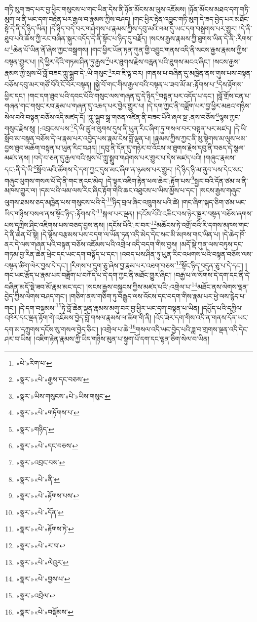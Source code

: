 གཏི་མུག་ཟད་པར་བྱ་ཕྱིར་གསུངས་པ་གང་ཡིན་དེས་ནི་ཉོན་མོངས་མ་ལུས་འཇོམས། །ཉོན་མོངས་མཐའ་དག་གཏི་མུག་ལ་ནི་ཡང་དག་བརྟེན་པར་རྒྱལ་བ་རྣམས་ཀྱིས་བཤད། །གང་ཕྱིར་རྟེན་འབྱུང་གཏི་མུག་དེ་ཟད་བྱེད་པར་མཐོང་སྟེ་དེ་ནི་དེ་ཉིད་ཡིན། །དེ་ཉིད་བདེ་བར་གཤེགས་པ་རྣམས་ཀྱིས་དབུ་མའི་ལམ་དུ་ཡང་དག་བསྒྲགས་པར་གྱུར། །དེ་ནི་ཐུབ་པའི་ཆོས་ཀྱི་རང་བཞིན་སྐུར་འདོད་དེ་ནི་སྟོང་པ་ཉིད་དུ་བརྗོད། །སངས་རྒྱས་རྣམས་ཀྱི་ཐུགས་ཡིན་དེ་ནི་:རིགས་པ་\footnote{«པེ་»རིག་པ་}ཆེན་པོ་ཡིན་ནོ་ཞེས་ཀྱང་བསྒྲགས། །གང་ཕྱིར་ཡོན་ཏན་ཀུན་གྱི་འབྱུང་གནས་འདི་ནི་སངས་རྒྱས་རྣམས་ཀྱིས་བསྟན་གྱུར་པ། །དེ་ཕྱིར་དེའི་གཏམ་ཤིན་ཏུ་རྒྱས་\footnote{«སྣར་»«པེ་»རྒྱས་དང་བཅས་}པར་ཐུགས་རྗེས་བརླན་པའི་ཐུགས་མངའ་ཞིང་། །སངས་རྒྱས་རྣམས་ཀྱི་སྲས་པོ་བློ་བཟང་ཀླུ་སྒྲུབ་དེ་:ཡི་གསུང་\footnote{«སྣར་»ཡིས་གསུངས་«པེ་»ཡིས་གསུང་}རབ་ཇི་ལྟ་བར། །གནས་པ་བཞིན་དུ་མཁྱེན་ནས་གུས་པས་བསྟན་བཅོས་དབུ་མར་གཙོ་བོའི་ངོ་བོར་བསྟན། །སྐྱེ་བོ་གང་གིས་རྒྱལ་བའི་བསྟན་པ་ཟབ་མོ་མ་:རྟོགས་པ་\footnote{«སྣར་»«པེ་»གཏོགས་པ་}དེས་རྟོགས་ཕྱིར་དང་། །གང་དག་ཐུབ་པའི་དབང་པོའི་གསུང་ལས་གཞན་དུ་དེ་ཉིད་\footnote{«སྣར་»གཉིད་}བསྟན་པར་འདོད་པ་དང་། །བློ་གྲོས་ངན་པ་གཞན་གང་གསུང་རབ་རྣམ་པ་གཞན་དུ་འཆད་པར་བྱེད་གྱུར་པ། །དེ་དག་ཀྱང་ནི་བཟློག་པར་བྱ་ཕྱིར་མཐའ་གཉིས་སེལ་བའི་བསྟན་བཅོས་འདི་མཛད་དོ། །ཀླུ་སྒྲུབ་སྒྲ་གཅན་འཛིན་ནི་བཟང་པོའི་ཞལ་སྔ་:ནས་བཅོས་\footnote{«སྣར་»«པེ་»དང་བཅས་}ལྷས་ཀྱང་གསུང་རྗེས་སུ། །:འབྲངས་པས་\footnote{«སྣར་»འབྲང་བས་}དེ་ཡི་ཚུལ་ལུགས་དུས་ནི་ཡུན་རིང་ཞིག་ཏུ་གསལ་བར་བསྟན་པར་མཛད། །དེ་ཡི་སློབ་མ་བསྟན་བཅོས་དེ་ལ་རྣམ་པར་འབྱེད་པས་རྣམ་ངེས་བློ་ལྡན་པ། །རྣམས་ཀྱིས་ཀྱང་ནི་མུ་སྟེགས་མ་ལུས་ཕམ་བྱས་ཐུབ་མཆོག་བསྟན་པ་ཡུན་རིང་བཤད། །དབུ་ནི་དོན་དུ་གཉེར་བ་འོངས་ལ་ཐུགས་རྗེས་དབུ་ནི་བཅད་དེ་སྩལ་མཛད་ནས། །བདེ་བ་ཅན་དུ་རྒྱལ་བའི་སྲས་པོ་ཀླུ་སྒྲུབ་གཤེགས་པར་གྱུར་པ་དེས་མཛད་པའི། །གཞུང་རྣམས་དང་:ནི་དེ་ཡི་\footnote{«སྣར་»«པེ་»ནི་}སློབ་མའི་ཚོགས་དེ་དག་ཀྱང་དུས་མང་ཞིག་ན་ཉམས་པར་གྱུར། །དེ་ཉིད་ཉི་མ་ནུབ་པས་དེང་སང་གཞུང་ལུགས་གསལ་པོ་དེ་ནི་གང་ནའང་མེད། །དེ་ལྟར་འཇིག་རྟེན་ཕལ་ཆེར་:རྟོག་པས་\footnote{«སྣར་»«པེ་»རྟོགས་པས་}སྦྱར་བའི་དོན་ཙམ་ལ་ནི་མཁས་གྱུར་ལ། །དམ་པའི་ལམ་ལས་རིང་ཞིང་རྟོག་གེའི་ཆང་འཐུངས་པ་ཡིས་མྱོས་པ་དང་། །སངས་རྒྱས་གཞུང་ལུགས་ཐམས་ཅད་མཁྱེན་པས་གསུངས་པའི་དེ་\footnote{«སྣར་»«པེ་»དོན་}ཉིད་བྲལ་ཞིང་འཁྲུགས་པའི་ཚེ། །གང་ཞིག་སྐད་ཅིག་ཙམ་ཡང་ཡིད་གཉིས་བསལ་ནས་སྟོང་ཉིད་:རྟོགས་དེ་\footnote{«སྣར་»«པེ་»རྟོགས་ཏེ་}སྐལ་པར་ལྡན། །དངོས་པོའི་འཆིང་བས་ཉེར་སྦྱར་བསྟན་བཅོས་ཞགས་པས་དཀྲིས་ཤིང་འཇིགས་པས་བཅད་བྱས་ནས། །དངོས་པོའི་:ར་བར་\footnote{«སྣར་»«པེ་»ར་བ་}མཆོངས་ཏེ་འགྲོ་བའི་རི་དགས་མཁས་གང་དེ་ནི་ཆེན་པོ་སྟེ། །དེ་ལྟོས་བརྩམས་པས་བདག་ལ་ཡོན་ཏན་འདི་མེད་དེང་སང་མི་མཁས་གང་ཡིན་པ། །དེ་ཆེད་ཁོ་ནར་དེ་ལས་གཞན་པའི་བསྟན་བཅོས་འཇོམས་པའི་འགྲེལ་འདི་བདག་གིས་བྱས། །མདོ་སྡེ་ཀུན་ལས་བཏུས་དང་གཏམ་བྱ་རིན་ཆེན་ཕྲེང་དང་ཡང་དག་བསྟོད་པ་དང་། །འབད་པས་ཤིན་ཏུ་ཡུན་རིང་འཕགས་པའི་བསྟན་བཅོས་ལས་བསྟན་ཚིག་ལེར་བྱས་དེ་དང་། །རིགས་པ་དྲུག་ཅུ་ཞེས་བྱ་རྣམ་པར་འཐག་བཅས་\footnote{«སྣར་»«པེ་»ལེའུར་}སྟོང་ཉིད་བདུན་ཅུ་པ་དེ་དང་། །གང་ཡང་རྩོད་པ་རྣམ་པར་བཟློག་པ་བཀོད་པ་དེ་དག་ཀྱང་ནི་མཐོང་གྱུར་ཞིང་། །བརྒྱ་པ་ལ་སོགས་དེ་དག་དང་ནི་དེ་བཞིན་མདོ་སྡེ་ཟབ་མོ་རྣམ་མང་དང་། །སངས་རྒྱས་བསྐྱངས་ཀྱིས་མཛད་པའི་:འགྲེལ་པ་\footnote{«སྣར་»«པེ་»བྱས་པ་}མཐོང་ནས་ལེགས་ལྡན་བྱེད་ཀྱིས་ལེགས་བཤད་གང་། །གཅིག་ནས་གཅིག་ཏུ་བརྒྱུད་ལས་འོངས་དང་བདག་གིས་རྣམ་པར་ཕྱེ་ལས་རྙེད་པ་གང་། །དེ་དག་བསྡམས་\footnote{«སྣར་»འབྲེལ་}ཏེ་བློ་ཆེན་ལྡན་རྣམས་མགུ་བར་བྱ་ཕྱིར་ཡང་དག་བསྟན་པ་ཡིན། །དཔྱོད་པའི་དཀྱིལ་འཁོར་དང་ལྡན་རྟོག་གེ་འཇོམས་བྱེད་བློ་གསལ་རྣམས་ལ་ཚིག་གི་ནི། །འོད་ཟེར་དག་གིས་འདི་ན་གནས་དོན་ཡང་དག་མ་དཀྲུགས་དངོས་སུ་གསལ་བྱེད་ཅིང་། །འགྲེལ་པ་ཆེ་\footnote{«སྣར་»«པེ་»བསྡོམས་}གསལ་འདི་ཡང་བྱེད་པའི་ཟླ་བ་གྲགས་ལྡན་འདི་དེང་ཤར་བ་ཡིས། །འཇིག་རྟེན་རྣམས་ཀྱི་ཡིད་གཉིས་མུན་པ་སྟུག་པོ་དག་དང་ལྷན་ཅིག་སེལ་བ་ཡིན། 